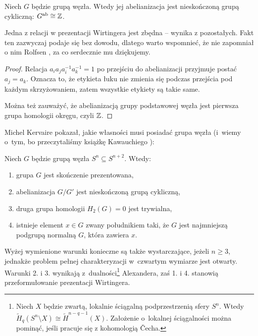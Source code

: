 \begin{corollary}
    Niech $G$ będzie grupą węzła.
    Wtedy jej abelianizacja jest nieskończoną grupą cykliczną: $G^{\operatorname{ab}} \cong \mathbb Z$.
\end{corollary}

Jedna z relacji w prezentacji Wirtingera jest zbędna -- wynika z pozostałych.
Fakt ten zazwyczaj podaje się bez dowodu, dlatego warto wspomnieć, że nie zapomniał o nim Rolfsen \cite[s. 56-60]{rolfsen1976}, za co serdecznie mu dziękujemy.

\begin{proof}
    Relacja $a_ia_ja_i^{-1}a_k^{-1}=1$ po przejściu do abelianizacji przyjmuje postać $a_j = a_k$.
    Oznacza to, że etykieta łuku nie zmienia się podczas przejścia pod każdym skrzyżowaniem, zatem wszystkie etykiety są takie same.

    Można też zauważyć, że abelianizacją grupy podstawowej węzła jest pierwsza grupa homologii okręgu, czyli $\mathbb Z$.
\end{proof}

Michel Kervaire \cite{kervaire1965} pokazał, jakie własności musi posiadać grupa węzła (i~wiemy o~tym, bo przeczytaliśmy książkę Kawauchiego \cite[tw. 14.1.1]{kawauchi1996}):
%

\begin{proposition}
%
%
    Niech $G$ będzie grupą węzła $S^n \subseteq S^{n+2}$.
    Wtedy:
    \begin{enumerate}
        \item grupa $G$ jest skończenie prezentowana,
        \item abelianizacja $G/G'$ jest nieskończoną grupą cykliczną,
        \item druga grupa homologii $H_2(G) = 0$ jest trywialna,
        \item istnieje element $x \in G$ zwany południkiem taki, że $G$ jest najmniejszą podgrupą normalną $G$, która zawiera $x$.
    \end{enumerate}
\end{proposition}

Wyżej wymienione warunki konieczne są także wystarczające, jeżeli $n \ge 3$, jednakże problem pełnej charakteryzacji w~czwartym wymiarze jest otwarty.
Warunki 2. i 3. wynikają z~dualności\footnote{Niech $X$ będzie zwartą, lokalnie ściągalną podprzestrzenią sfery $S^n$. Wtedy $\tilde {H}_{q}(S^n \setminus X) \cong \tilde H^{n-q-1}(X)$. Założenie o~lokalnej ściągalności można pominąć, jeśli pracuje się z kohomologią Čecha.} Alexandera, zaś 1. i 4. stanowią przeformułowanie prezentacji Wirtingera.

%

